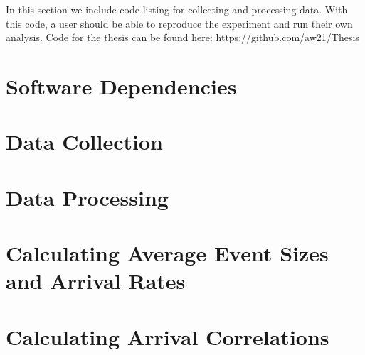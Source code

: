 In this section we include code listing for collecting and processing data. With this code, a user should be able to reproduce the experiment and run their own analysis. Code for the thesis can be found here: https://github.com/aw21/Thesis

\section{Software Dependencies}
\begin{singlespacing}

\end{singlespacing}

\section{Data Collection}
\begin{singlespacing}
\label{data-collection-code}
\end{singlespacing}

\section{Data Processing}
\begin{singlespacing}
\label{data-processing-code}
\end{singlespacing}

\section{Calculating Average Event Sizes and Arrival Rates}
\begin{singlespacing}
\label{AES_and_rate_code}
\end{singlespacing}

\section{Calculating Arrival Correlations}
\begin{singlespacing}
\label{correlation-code}
\end{singlespacing}

